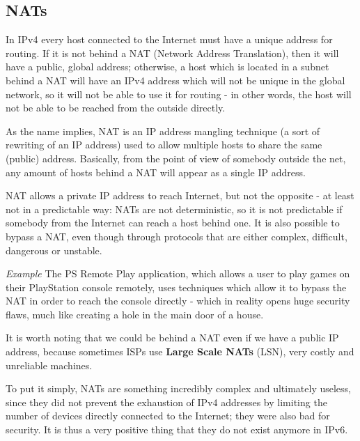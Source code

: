 
\subsection{NATs}
In IPv4 every host connected to the Internet must have a unique address for routing. If it is not behind a NAT (Network Address Translation), then it will have a public, global address; otherwise, a host which is located in a subnet behind a NAT will have an IPv4 address which will not be unique in the global network, so it will not be able to use it for routing - in other words, the host will not be able to be reached from the outside directly.

As the name implies, NAT is an IP address mangling technique (a sort of rewriting of an IP address) used to allow multiple hosts to share the same (public) address. Basically, from the point of view of somebody outside the net, any amount of hosts behind a NAT will appear as a single IP address.

NAT allows a private IP address to reach Internet, but not the opposite - at least not in a predictable way: NATs are not deterministic, so it is not predictable if somebody from the Internet can reach a host behind one. It is also possible to bypass a NAT, even though through protocols that are either complex, difficult, dangerous or unstable.

\vspace{0.5em}

\emph{Example} The PS Remote Play application, which allows a user to play games on their PlayStation console remotely, uses techniques which allow it to bypass the NAT in order to reach the console directly - which in reality opens huge security flaws, much like creating a hole in the main door of a house.

\vspace{0.5em}

It is worth noting that we could be behind a NAT even if we have a public IP address, because sometimes ISPs use \textbf{Large Scale NATs} (LSN), very costly and unreliable machines.

To put it simply, NATs are something incredibly complex and ultimately useless, since they did not prevent the exhaustion of IPv4 addresses by limiting the number of devices directly connected to the Internet; they were also bad for security. It is thus a very positive thing that they do not exist anymore in IPv6.

